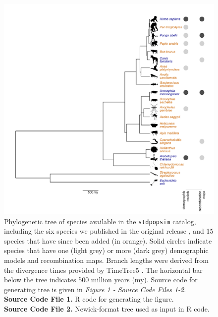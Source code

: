 \documentclass[hidelinks]{article}
\newcommand{\stdpopsim}{\texttt{stdpopsim}\xspace}
\begin{document}
\begin{figure}
    \includegraphics[width=\linewidth]{figs/species_fig}
	\caption{Phylogenetic tree of species available in the \stdpopsim catalog,
		including the six species we published in the original release \citep[in blue]{Adrion2020}, and 15 species that have since been added (in orange).
		Solid circles indicate species that have one (light grey) or more
		(dark grey) demographic models and recombination maps.
		Branch lengths were derived from the divergence times provided by TimeTree5 \citep{Kumar2022}.
		The horizontal bar below the tree indicates 500 million years (my).
		Source code for generating tree is given in {\em Figure 1 - Source Code Files 1-2}.\\
		{\bf Source Code File 1.} R code for generating the figure.\\
		{\bf Source Code File 2.} Newick-format tree used as input in R code.\\
	\label{fig:tree} }
\end{figure}
\end{document}
